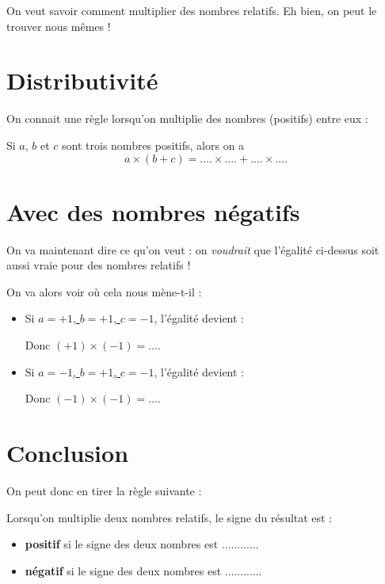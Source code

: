 \documentclass[a4paper,12pt]{article}
\begin{document}
\maketitle

On veut savoir comment multiplier des nombres relatifs. Eh bien, on peut le trouver nous mêmes !

\section*{Distributivité}

On connait une règle lorsqu'on multiplie des nombres (positifs) entre eux :

Si $a$, $b$ et $c$ sont trois nombres positifs, alors on a
$$ a × (b + c) = .... × .... + .... × .... $$

\section*{Avec des nombres négatifs}

On va maintenant dire ce qu'on veut : on \textit{voudrait} que l'égalité ci-dessus soit aussi vraie pour des nombres relatifs !

On va alors voir où cela nous mène-t-il :

\begin{itemize}
	\item Si \uline{$a = +1$, $b = +1$, $c = -1$}, l'égalité devient :
	      \vspace{7.5em}

	      Donc $(+1) × (-1) = ....$
	\item Si \uline{$a = -1$, $b = +1$, $c = -1$}, l'égalité devient :
	      \vspace{7.5em}

	      Donc $(-1) × (-1) = ....$
\end{itemize}

\section*{Conclusion}

On peut donc en tirer la règle suivante :

\begin{greybox}[frametitle={Règle}]
	Lorsqu'on multiplie deux nombres relatifs, le signe du résultat est :
	\vspace{0.5em}
	\begin{itemize}
		\item \textbf{positif} si le signe des deux nombres est ............
		      \vspace{0.5em}
		\item \textbf{négatif} si le signe des deux nombres est ............
	\end{itemize}
\end{greybox}
\end{document}
